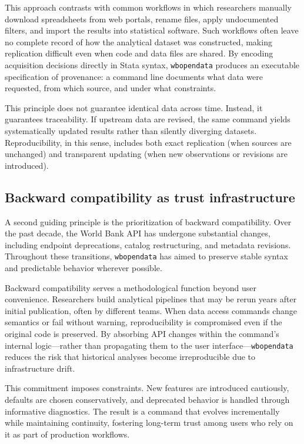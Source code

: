 \documentclass[bib]{statapress}
\begin{document}
This approach contrasts with common workflows in which researchers manually download
spreadsheets from web portals, rename files, apply undocumented filters, and import the
results into statistical software. Such workflows often leave no complete record of how
the analytical dataset was constructed, making replication difficult even when code and
data files are shared. By encoding acquisition decisions directly in Stata syntax,
\texttt{wbopendata} produces an executable specification of provenance: a command line
documents what data were requested, from which source, and under what constraints.

This principle does not guarantee identical data across time. Instead, it guarantees
traceability. If upstream data are revised, the same command yields systematically
updated results rather than silently diverging datasets. Reproducibility, in this sense,
includes both exact replication (when sources are unchanged) and transparent updating
(when new observations or revisions are introduced).

\subsection{Backward compatibility as trust infrastructure}
A second guiding principle is the prioritization of backward compatibility. Over the
past decade, the World Bank API has undergone substantial changes, including endpoint
deprecations, catalog restructuring, and metadata revisions. Throughout these transitions,
\texttt{wbopendata} has aimed to preserve stable syntax and predictable behavior wherever
possible.

Backward compatibility serves a methodological function beyond user convenience.
Researchers build analytical pipelines that may be rerun years after initial publication,
often by different teams. When data access commands change semantics or fail without
warning, reproducibility is compromised even if the original code is preserved. By
absorbing API changes within the command's internal logic---rather than propagating them
to the user interface---\texttt{wbopendata} reduces the risk that historical analyses become
irreproducible due to infrastructure drift.

This commitment imposes constraints. New features are introduced cautiously, defaults are
chosen conservatively, and deprecated behavior is handled through informative diagnostics.
The result is a command that evolves incrementally while maintaining continuity, fostering
long-term trust among users who rely on it as part of production workflows.
\end{document}
